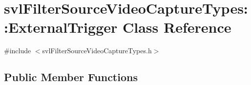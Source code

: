 \hypertarget{classsvl_filter_source_video_capture_types_1_1_external_trigger}{}\section{svl\+Filter\+Source\+Video\+Capture\+Types\+:\+:External\+Trigger Class Reference}
\label{classsvl_filter_source_video_capture_types_1_1_external_trigger}


{\ttfamily \#include $<$svl\+Filter\+Source\+Video\+Capture\+Types.\+h$>$}

\subsection*{Public Member Functions}
